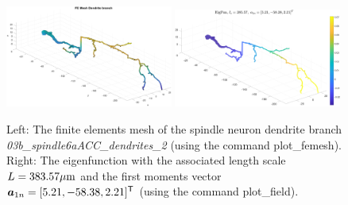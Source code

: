 \documentclass[a4paper]{article}
\begin{document}
\begin{figure}
    \centering
    \includegraphics[width=0.49\textwidth]{paper/FEmesh_dendrite}
    \includegraphics[width=0.49\textwidth]{paper/eigfun}
    \caption{Left: The finite elements mesh of the spindle neuron dendrite branch {\it 03b\_spindle6aACC\_dendrites\_2} (using the command plot\_femesh). Right: The eigenfunction with the associated length scale $L=383.57\mathrm{\mu m}$ and the first moments vector $\bm{a}_{1n}=[5.21,-58.38,2.21]^{\mathsf{T}}$ (using the command plot\_field).}
    \label{fig:spindle_dendrite_eigfunc}
\end{figure}
\end{document}
